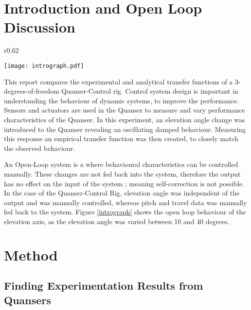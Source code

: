 \section{Introduction and Open Loop
Discussion}\label{introduction-and-open-loop-discussion}

\begin{wrapfigure}{r}{0.62\textwidth}
  \begin{center}
  \vspace{-20pt}
  \texttt{[image: intrograph.pdf]}
  \end{center}
  \caption{Graph Showing the Open Loop Nature of the Experimental Quanser Response}
  \label{intrograph}
  \vspace{-15pt}
\end{wrapfigure}

This report compares the experimental and analytical transfer functions
of a 3-degrees-of-freedom Quanser-Control rig. Control system design is
important in understanding the behaviour of dynamic systems, to improve
the performance. Sensors and actuators are used in the Quanser to
measure and vary performance characteristics of the Quanser. In this
experiment, an elevation angle change was introduced to the Quanser
revealing an oscillating damped behaviour. Measuring this response an
empirical transfer function was then created, to closely match the
observed behaviour.

An Open-Loop system is a where behavioural characteristics can be
controlled manually. These changes are not fed back into the system,
therefore the output has no effect on the input of the system
\cite{openloop}; meaning self-correction is not possible. In the case of
the Quanser-Control Rig, elevation angle was independent of the output
and was manually controlled, whereas pitch and travel data was manually
fed back to the system. Figure \ref{intrograph} shows the open loop
behaviour of the elevation axis, as the elevation angle was varied
between 10 and 40 degrees.

\section{Method}\label{method}

\subsection{Finding Experimentation Results from
Quansers}\label{finding-experimentation-results-from-quansers}

